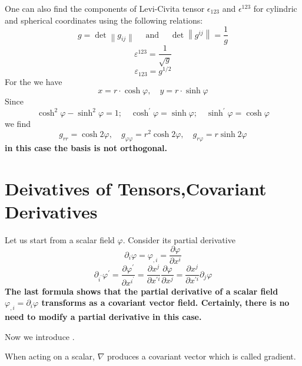 One can also find the components of Levi-Civita tensor $\epsilon_{123}$ and $\epsilon^{123}$ for cylindric and spherical coordinates using the following relations:
\begin{equation}
g=\operatorname{det}\left\|g_{i j}\right\| \quad \text { and } \quad \operatorname{det}\left\|g^{i j}\right\|=\frac{1}{g}
\end{equation}
$$
\varepsilon^{123}=\frac{1}{\sqrt{g}}
$$
$$
\varepsilon_{123}=g^{1 / 2}
$$
For the  we have
$$
x=r \cdot \cosh \varphi, \quad y=r \cdot \sinh \varphi
$$
Since
$$
\cosh ^{2} \varphi-\sinh ^{2} \varphi=1 ; \quad \cosh ^{\prime} \varphi=\sinh \varphi ; \quad \sinh ^{\prime} \varphi=\cosh \varphi
$$
we find
$$
g_{r r}=\cosh 2 \varphi, \quad g_{\varphi \varphi}=r^{2} \cosh 2 \varphi, \quad g_{r \varphi}=r \sinh 2 \varphi
$$
\textbf{in this case the basis is not orthogonal.}
\section{Deivatives of Tensors,Covariant Derivatives}
Let us start from a scalar field $\varphi$. Consider its partial derivative
\begin{equation}
\partial_{i} \varphi=\varphi_{, i}=\frac{\partial \varphi}{\partial x^{i}}
\end{equation}
$$
\partial_{i^{\prime}} \varphi^{\prime}=\frac{\partial \varphi^{\prime}}{\partial x^{i^{\prime}}}=\frac{\partial x^{j}}{\partial x^{\prime i}} \frac{\partial \varphi}{\partial x^{j}}=\frac{\partial x^{j}}{\partial x^{\prime i}} \partial_{j} \varphi
$$
\textbf{The last formula shows that the partial derivative of a scalar field $\varphi_{, i}=\partial_{i} \varphi$ transforms as a covariant vector field. Certainly, there is no need to modify a partial derivative in this case.}

Now we introduce . 
\begin{qt}
When acting on a scalar, $\nabla$ produces a covariant vector which is called gradient.
\end{qt}

